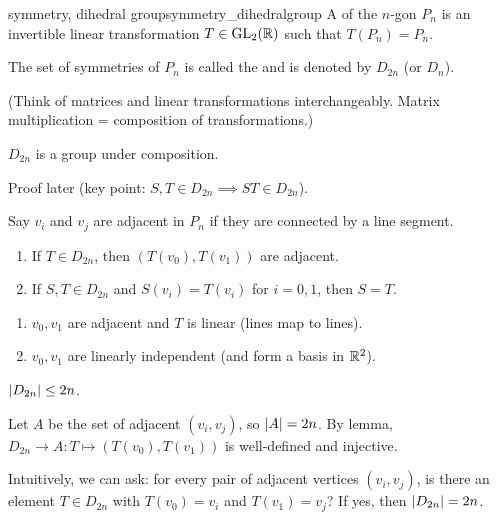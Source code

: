 \documentclass[12pt,letterpaper]{report}
\begin{document}
\begin{defn}{symmetry, dihedral group}{symmetry_dihedralgroup}
  A  of the $n$-gon $P_n$ is an invertible linear transformation
  $T \in \operatorname{GL}_2(\mathbb{R})$ such that $T(P_n) = P_n$.

  The set of symmetries of $P_n$ is called the  and is denoted by $D_{2n}$
  (or $D_n$).
\end{defn}

(Think of matrices and linear transformations interchangeably.
Matrix multiplication = composition of transformations.)

\begin{prop}{}{}
  $D_{2n}$ is a group under composition.
\end{prop}

Proof later (key point: $S, T \in D_{2n} \implies ST \in D_{2n}$).

\begin{lem}{}{}
  Say $v_i$ and $v_j$ are adjacent in $P_n$ if they are connected by a line segment.
  \begin{enumerate}
    \item If $T \in D_{2n}$, then $(T(v_0), T(v_1))$ are adjacent.
    \item If $S, T \in D_{2n}$ and $S(v_i) = T(v_i)$ for $i = 0, 1$, then $S = T$.
  \end{enumerate}
\end{lem}

\begin{thmproof}
  \begin{enumerate}
    \item $v_0, v_1$ are adjacent and $T$ is linear (lines map to lines).
    \item $v_0, v_1$ are linearly independent (and form a basis in $\mathbb{R}^2$).
  \end{enumerate}
\end{thmproof}

\begin{cor}{}{}
  $\lvert D_{2n}\rvert \leq 2n$.
\end{cor}

\begin{thmproof}
  Let $A$ be the set of adjacent $(v_i, v_j)$, so $\lvert A\rvert = 2n$.
  By lemma, $D_{2n} \to A : T \mapsto (T(v_0), T(v_1))$ is well-defined and injective.
\end{thmproof}

Intuitively, we can ask: for every pair of adjacent vertices $(v_i, v_j)$, is there an element
$T \in D_{2n}$ with $T(v_0) = v_i$ and $T(v_1) = v_j$?
If yes, then $\lvert D_{2n}\rvert = 2n$.
\end{document}
